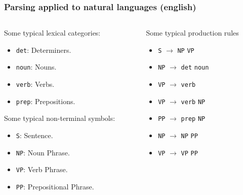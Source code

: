 \documentclass[11pt]{beamer}
\begin{document}
\begin{frame}
	\frametitle{Parsing applied to natural languages (english)}
	\begin{columns}
		\begin{column}{0.5\textwidth}
			Some typical lexical categories:
			\begin{itemize}
				\item \texttt{det}: Determiners.
				\item \texttt{noun}: Nouns.
				\item \texttt{verb}: Verbs.
				\item \texttt{prep}: Prepositions.
			\end{itemize}
			\pause
			\vspace{10pt}
			Some typical non-terminal symbols:
			\begin{itemize}
				\item \texttt{S}: Sentence.
				\item \texttt{NP}: Noun Phrase.
				\item \texttt{VP}: Verb Phrase.
				\item \texttt{PP}: Prepositional Phrase.
			\end{itemize}	
		\end{column}
		\pause
		\begin{column}{0.5\textwidth}
			Some typical production rules
			\begin{itemize}
				\item \texttt{S} $\rightarrow$ \texttt{NP} \texttt{VP}
				\item \texttt{NP} $\rightarrow$ \texttt{det} \texttt{noun}
				\item \texttt{VP} $\rightarrow$ \texttt{verb} 
				\item \texttt{VP} $\rightarrow$ \texttt{verb} \texttt{NP}
				\item \texttt{PP} $\rightarrow$ \texttt{prep} \texttt{NP}
				\item \texttt{NP} $\rightarrow$ \texttt{NP} \texttt{PP}
				\item \texttt{VP} $\rightarrow$ \texttt{VP} \texttt{PP}
			\end{itemize}
		\end{column}
	\end{columns}
\end{frame}
\end{document}
